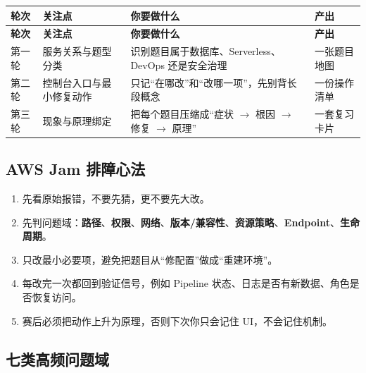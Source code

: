 \documentclass[12pt,a4paper]{article}
\newcommand{\term}[1]{\textcolor{terracotta}{\textbf{#1}}}
\begin{document}
\begin{longtable}{@{}L{2.0cm}L{3.9cm}L{4.05cm}L{3.95cm}@{}}
\textbf{轮次} & \textbf{关注点} & \textbf{你要做什么} & \textbf{产出} \\
\midrule
\endfirsthead
{}
\textbf{轮次} & \textbf{关注点} & \textbf{你要做什么} & \textbf{产出} \\
\midrule
\endhead
第一轮 & 服务关系与题型分类 & 识别题目属于数据库、Serverless、DevOps 还是安全治理 & 一张题目地图 \\
第二轮 & 控制台入口与最小修复动作 & 只记“在哪改”和“改哪一项”，先别背长段概念 & 一份操作清单 \\
第三轮 & 现象与原理绑定 & 把每个题目压缩成“症状 $\rightarrow$ 根因 $\rightarrow$ 修复 $\rightarrow$ 原理” & 一套复习卡片 \\
\bottomrule
\end{longtable}

\subsection{AWS Jam 排障心法}

\begin{principlebox}
  \begin{enumerate}
    \item 先看原始报错，不要先猜，更不要先大改。
    \item 先判问题域：\term{路径}、\term{权限}、\term{网络}、\term{版本/兼容性}、\term{资源策略}、\term{Endpoint}、\term{生命周期}。
    \item 只改最小必要项，避免把题目从“修配置”做成“重建环境”。
    \item 每改完一次都回到验证信号，例如 Pipeline 状态、日志是否有新数据、角色是否恢复访问。
    \item 赛后必须把动作上升为原理，否则下次你只会记住 UI，不会记住机制。
  \end{enumerate}
\end{principlebox}

\subsection{七类高频问题域}
\end{document}
